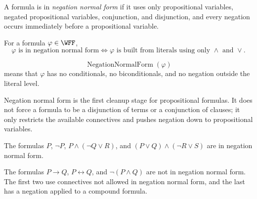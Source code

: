\begin{tcolorbox}[colback=propbox, colframe=propborder, arc=2pt,
  left=6pt, right=6pt, top=4pt, bottom=4pt,
  title={\small\textbf{Definition (Negation Normal Form)}},
  fonttitle=\small\bfseries]
\begin{definition}
\label{def:negation-normal-form-propositional-logic}
A formula is in \emph{negation normal form} if it uses only propositional
variables, negated propositional variables, conjunction, and disjunction, and
every negation occurs immediately before a propositional variable.
\end{definition}
\end{tcolorbox}

\begin{remark*}
For a formula \(\varphi\in\WFF\),
\[
\varphi\text{ is in negation normal form}
\Longleftrightarrow
\varphi\text{ is built from literals using only }\land\text{ and }\lor.
\]
\end{remark*}

\begin{remark*}
\[
\operatorname{NegationNormalForm}(\varphi)
\]
means that \(\varphi\) has no conditionals, no biconditionals, and no negation
outside the literal level.
\end{remark*}

\begin{remark*}[Interpretation]
Negation normal form is the first cleanup stage for propositional formulas.
It does not force a formula to be a disjunction of terms or a conjunction of
clauses; it only restricts the available connectives and pushes negation down
to propositional variables.
\end{remark*}

\begin{remark*}[Examples]
The formulas \(P\), \(\neg P\), \(P\land(\neg Q\lor R)\), and
\((P\lor Q)\land(\neg R\lor S)\) are in negation normal form.
\end{remark*}

\begin{remark*}
The formulas \(P\to Q\), \(P\leftrightarrow Q\), and \(\neg(P\land Q)\) are not
in negation normal form. The first two use connectives not allowed in negation
normal form, and the last has a negation applied to a compound formula.
\end{remark*}

